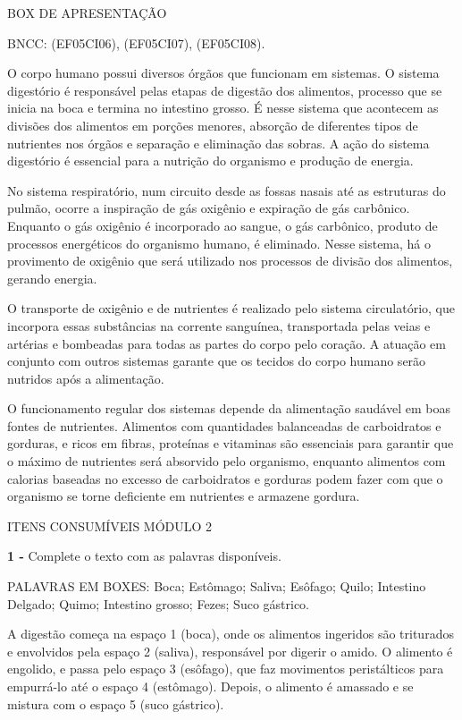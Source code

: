 BOX DE APRESENTAÇÃO

BNCC: (EF05CI06), (EF05CI07), (EF05CI08).

O corpo humano possui diversos órgãos que funcionam em sistemas. O
sistema digestório é responsável pelas etapas de digestão dos alimentos,
processo que se inicia na boca e termina no intestino grosso. É nesse
sistema que acontecem as divisões dos alimentos em porções menores,
absorção de diferentes tipos de nutrientes nos órgãos e separação e
eliminação das sobras. A ação do sistema digestório é essencial para a
nutrição do organismo e produção de energia.

No sistema respiratório, num circuito desde as fossas nasais até as
estruturas do pulmão, ocorre a inspiração de gás oxigênio e expiração de
gás carbônico. Enquanto o gás oxigênio é incorporado ao sangue, o gás
carbônico, produto de processos energéticos do organismo humano, é
eliminado. Nesse sistema, há o provimento de oxigênio que será utilizado
nos processos de divisão dos alimentos, gerando energia.

O transporte de oxigênio e de nutrientes é realizado pelo sistema
circulatório, que incorpora essas substâncias na corrente sanguínea,
transportada pelas veias e artérias e bombeadas para todas as partes do
corpo pelo coração. A atuação em conjunto com outros sistemas garante
que os tecidos do corpo humano serão nutridos após a alimentação.

O funcionamento regular dos sistemas depende da alimentação saudável em
boas fontes de nutrientes. Alimentos com quantidades balanceadas de
carboidratos e gorduras, e ricos em fibras, proteínas e vitaminas são
essenciais para garantir que o máximo de nutrientes será absorvido pelo
organismo, enquanto alimentos com calorias baseadas no excesso de
carboidratos e gorduras podem fazer com que o organismo se torne
deficiente em nutrientes e armazene gordura.

\protect\hypertarget{_hc6e9qv451au}{}{}ITENS CONSUMÍVEIS MÓDULO 2

\textbf{1 -} Complete o texto com as palavras disponíveis.

PALAVRAS EM BOXES: Boca; Estômago; Saliva; Esôfago; Quilo; Intestino
Delgado; Quimo; Intestino grosso; Fezes; Suco gástrico.

A digestão começa na espaço 1 (boca), onde os alimentos ingeridos são
triturados e envolvidos pela espaço 2 (saliva), responsável por digerir
o amido. O alimento é engolido, e passa pelo espaço 3 (esôfago), que faz
movimentos peristálticos para empurrá-lo até o espaço 4 (estômago).
Depois, o alimento é amassado e se mistura com o espaço 5 (suco
gástrico).

